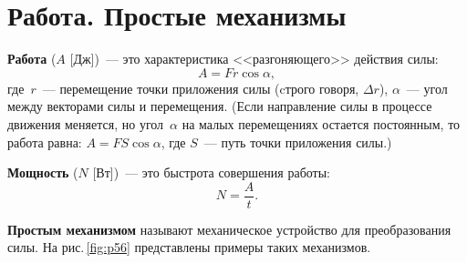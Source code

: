\documentclass[main.tex]{subfiles}
\begin{document}

\pagestyle{empty}

 

\setcounter{section}{31
}
\addtocounter{section}{-1} 

\section{Работа. Простые механизмы}

\textbf{Работа} ($A$ [Дж])~--- это характеристика <<разгоняющего>> действия силы:
\begin{equation}
    A=Fr\cos\alpha,
\end{equation}
где~$r$~--- перемещение точки приложения силы (cтрого говоря, $\Delta r$), $\alpha$~--- угол между векторами силы и перемещения. (Если направление силы в процессе движения меняется, но угол~$\alpha$ на малых перемещениях остается постоянным, то работа равна: $A=FS\cos\alpha$, где $S$~--- путь точки приложения силы.)

\textbf{Мощность} ($N$ [Вт])~--- это быстрота совершения работы:
\begin{equation}
    N=\frac{A}{t}.
\end{equation}
%

\textbf{Простым механизмом} называют механическое устройство для преобразования силы. На рис.\,\ref{fig:p56} представлены примеры таких механизмов.
\end{document}
